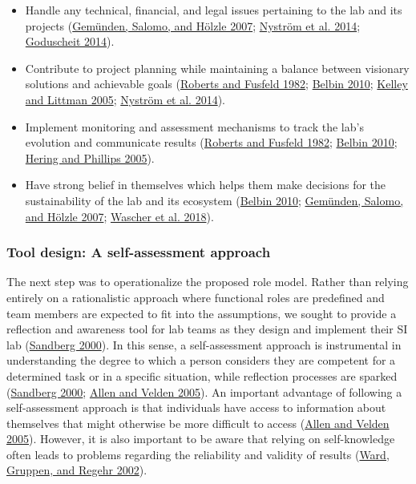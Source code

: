 \documentclass[AMA,STIX1COL,APA,STIX2COL]{WileyNJD-v2}
\providecommand{\tightlist}{%
  \setlength{\itemsep}{0pt}\setlength{\parskip}{0pt}}
\begin{document}
\begin{itemize}
\tightlist
\item
  Handle any technical, financial, and legal issues pertaining to the
  lab and its projects (\protect\hyperlink{ref-Gemunden2007}{Gemünden,
  Salomo, and Hölzle 2007}; \protect\hyperlink{ref-Nystrom2014}{Nyström
  et al. 2014}; \protect\hyperlink{ref-Goduscheit2014}{Goduscheit
  2014}).
\item
  Contribute to project planning while maintaining a balance between
  visionary solutions and achievable goals
  (\protect\hyperlink{ref-Roberts1982}{Roberts and Fusfeld 1982};
  \protect\hyperlink{ref-Belbin2010}{Belbin 2010};
  \protect\hyperlink{ref-Kelley2005}{Kelley and Littman 2005};
  \protect\hyperlink{ref-Nystrom2014}{Nyström et al. 2014}).
\item
  Implement monitoring and assessment mechanisms to track the lab's
  evolution and communicate results
  (\protect\hyperlink{ref-Roberts1982}{Roberts and Fusfeld 1982};
  \protect\hyperlink{ref-Belbin2010}{Belbin 2010};
  \protect\hyperlink{ref-Hering2005}{Hering and Phillips 2005}).
\item
  Have strong belief in themselves which helps them make decisions for
  the sustainability of the lab and its ecosystem
  (\protect\hyperlink{ref-Belbin2010}{Belbin 2010};
  \protect\hyperlink{ref-Gemunden2007}{Gemünden, Salomo, and Hölzle
  2007}; \protect\hyperlink{ref-Wascher2018}{Wascher et al. 2018}).
\end{itemize}

\hypertarget{tool-design-a-self-assessment-approach}{%
\subsubsection{Tool design: A self-assessment
approach}\label{tool-design-a-self-assessment-approach}}

The next step was to operationalize the proposed role model. Rather than
relying entirely on a rationalistic approach where functional roles are
predefined and team members are expected to fit into the assumptions, we
sought to provide a reflection and awareness tool for lab teams as they
design and implement their SI lab
(\protect\hyperlink{ref-Sandberg2000}{Sandberg 2000}). In this sense, a
self-assessment approach is instrumental in understanding the degree to
which a person considers they are competent for a determined task or in
a specific situation, while reflection processes are sparked
(\protect\hyperlink{ref-Sandberg2000}{Sandberg 2000};
\protect\hyperlink{ref-Allen2005}{Allen and Velden 2005}). An important
advantage of following a self-assessment approach is that individuals
have access to information about themselves that might otherwise be more
difficult to access (\protect\hyperlink{ref-Allen2005}{Allen and Velden
2005}). However, it is also important to be aware that relying on
self-knowledge often leads to problems regarding the reliability and
validity of results (\protect\hyperlink{ref-Ward2002}{Ward, Gruppen, and
Regehr 2002}).
\end{document}
